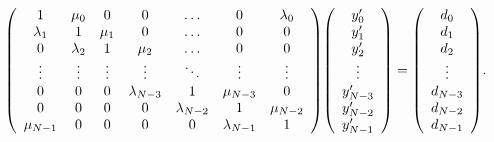 \documentclass{article}
\newenvironment{MyMatrix}{\begin{array}({*{20}{c}})}{\end{array}}
\begin{document}
\begin{equation}
\begin{MyMatrix}
1         & \mu_0     &    0   &   0           & \dots         &      0        & \lambda_0 \\
\lambda_1 &  1        & \mu_1  &   0           & \dots         &      0        &     0     \\
0         & \lambda_2 &   1    & \mu_2         & \dots         &      0        &     0     \\
\vdots    & \vdots    & \vdots & \vdots        & \ddots        &   \vdots      &  \vdots   \\
0         &   0       &   0    & \lambda_{N-3} &      1        & \mu_{N-3}     &    0      \\
0         &   0       &   0    &   0    & \lambda_{N-2} &      1        & \mu_{N-2} \\
\mu_{N-1} &   0       &   0    &   0    &   0           & \lambda_{N-1} &  1     
\end{MyMatrix}
\begin{MyMatrix} y'_0 \\ y'_1 \\ y'_2 \\ \vdots \\ y'_{N-3} \\ y'_{N-2} \\ y'_{N-1} \end{MyMatrix} =
\begin{MyMatrix} d_0  \\  d_1 \\  d_2 \\ \vdots \\  d_{N-3} \\  d_{N-2} \\  d_{N-1} \end{MyMatrix} .
\end{equation}
\end{document}
